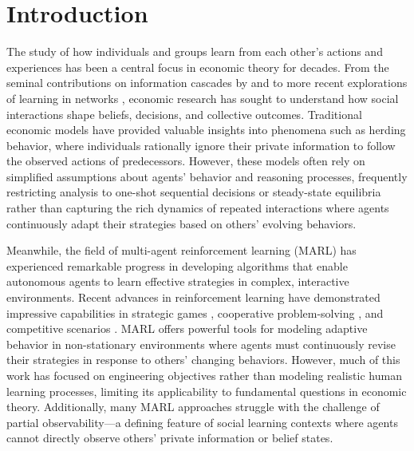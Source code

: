 \documentclass[a4paper,12pt]{report}
\begin{document}
\tableofcontents
\newpage


\chapter{Introduction}
\setcounter{page}{1}
The study of how individuals and groups learn from each other's actions and experiences has been a central focus in economic theory for decades. From the seminal contributions on information cascades by \citet{banerjee1992simple} and \citet{bikhchandani1992theory} to more recent explorations of learning in networks \citep{acemoglu2011bayesian, golub2010naive}, economic research has sought to understand how social interactions shape beliefs, decisions, and collective outcomes. Traditional economic models have provided valuable insights into phenomena such as herding behavior, where individuals rationally ignore their private information to follow the observed actions of predecessors. However, these models often rely on simplified assumptions about agents' behavior and reasoning processes, frequently restricting analysis to one-shot sequential decisions or steady-state equilibria rather than capturing the rich dynamics of repeated interactions where agents continuously adapt their strategies based on others' evolving behaviors.

Meanwhile, the field of multi-agent reinforcement learning (MARL) has experienced remarkable progress in developing algorithms that enable autonomous agents to learn effective strategies in complex, interactive environments. Recent advances in reinforcement learning have demonstrated impressive capabilities in strategic games \citep{silver2016mastering}, cooperative problem-solving \citep{baker2020emergentreciprocityteamformation}, and competitive scenarios \citep{openai2019dota2largescale}.  MARL offers powerful tools for modeling adaptive behavior in non-stationary environments where agents must continuously revise their strategies in response to others' changing behaviors. However, much of this work has focused on engineering objectives rather than modeling realistic human learning processes, limiting its applicability to fundamental questions in economic theory. Additionally, many MARL approaches struggle with the challenge of partial observability—a defining feature of social learning contexts where agents cannot directly observe others' private information or belief states.
\end{document}
